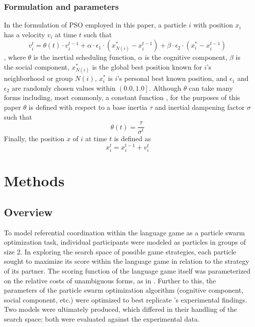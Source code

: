 \documentclass[12pt,a4paper]{article}
\begin{document}
\subsubsection{Formulation and parameters}
In the formulation of PSO employed in this paper, a particle $i$ with position $x_i$ has a velocity $v_i$ at time $t$ such that
\[
v_i^t = \theta(t) \cdot v_i^{t-1} + \alpha \cdot \epsilon_1 \cdot (x_{N(i)}^* - x_i^{t-1}) + \beta \cdot \epsilon_2 \cdot (x_i^* - x_i^{t-1})
\],
where $\theta$ is the inertial scheduling function, $\alpha$ is the cognitive component, $\beta$ is the social component, $x_{N(i)}^*$ is the global best position known for $i$'s neighborhood or group $N(i)$, $x_i^*$ is $i$'s personal best known position, and $\epsilon_1$ and $\epsilon_2$ are randomly chosen values within $\left(0.0, 1.0\right]$. Although $\theta$ can take many forms including, most commonly, a constant function \citep[p.~101]{yang2014}, for the purposes of this paper $\theta$ is defined with respect to a base inertia $\tau$ and inertial dampening factor $\sigma$ such that
\[
\theta(t) = \frac{\tau}{\sigma^t} 
\]
Finally, the position $x$ of $i$ at time $t$ is defined as
\[
x_i^t = x_i^{t-1} + v_i^t 
\]

\section{Methods}

\subsection{Overview}

To model referential coordination within the \citeauthor{rohde2012} language game as a particle swarm optimization task, individual participants were modeled as particles in groups of size $2$. In exploring the search space of possible game strategies, each particle sought to maximize its score within the language game in relation to the strategy of its partner. The scoring function of the language game itself was parameterized on the relative costs of unambiguous forms, as in \citeauthor{rohde2012}. Further to this, the parameters of the particle swarm optimization algorithm (cognitive component, social component, etc.) were optimized to best replicate \citeauthor{rohde2012}'s experimental findings. Two models were ultimately produced, which differed in their handling of the search space; both were evaluated against the experimental data.
\end{document}

